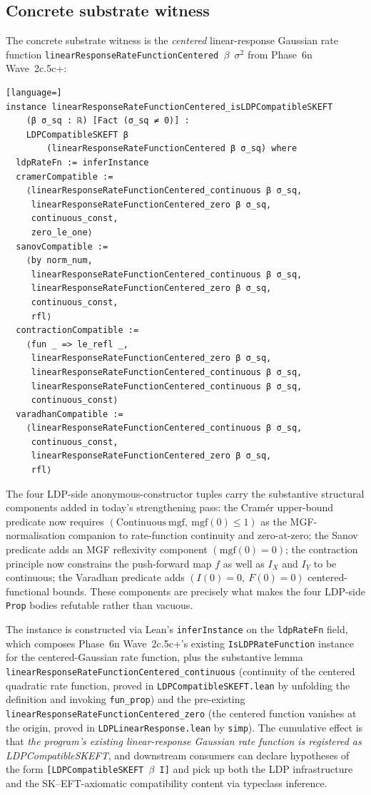 \documentclass[11pt]{article}
\begin{document}
\subsection{Concrete substrate witness}

The concrete substrate witness is the \emph{centered} linear-response
Gaussian rate function
\texttt{linearResponseRateFunctionCentered $\beta$ $\sigma^2$}
from Phase~6n Wave~2c.5c+:

\begin{lstlisting}[language=]
instance linearResponseRateFunctionCentered_isLDPCompatibleSKEFT
    (β σ_sq : ℝ) [Fact (σ_sq ≠ 0)] :
    LDPCompatibleSKEFT β
        (linearResponseRateFunctionCentered β σ_sq) where
  ldpRateFn := inferInstance
  cramerCompatible :=
    ⟨linearResponseRateFunctionCentered_continuous β σ_sq,
     linearResponseRateFunctionCentered_zero β σ_sq,
     continuous_const,
     zero_le_one⟩
  sanovCompatible :=
    ⟨by norm_num,
     linearResponseRateFunctionCentered_continuous β σ_sq,
     linearResponseRateFunctionCentered_zero β σ_sq,
     continuous_const,
     rfl⟩
  contractionCompatible :=
    ⟨fun _ => le_refl _,
     linearResponseRateFunctionCentered_zero β σ_sq,
     linearResponseRateFunctionCentered_continuous β σ_sq,
     linearResponseRateFunctionCentered_continuous β σ_sq,
     continuous_const⟩
  varadhanCompatible :=
    ⟨linearResponseRateFunctionCentered_continuous β σ_sq,
     continuous_const,
     linearResponseRateFunctionCentered_zero β σ_sq,
     rfl⟩
\end{lstlisting}

The four LDP-side anonymous-constructor tuples carry the substantive
structural components added in today's strengthening pass: the
Cram\'er upper-bound predicate now requires $(\mathrm{Continuous}\ \mathrm{mgf},\ \mathrm{mgf}(0) \leq 1)$
as the MGF-normalisation companion to rate-function continuity and
zero-at-zero; the Sanov predicate adds an MGF reflexivity component
$(\mathrm{mgf}(0) = 0)$; the contraction principle now constrains
the push-forward map $f$ as well as $I_X$ and $I_Y$ to be continuous;
the Varadhan predicate adds $(I(0) = 0,\ F(0) = 0)$ centered-functional
bounds. These components are precisely what makes the four LDP-side
\texttt{Prop} bodies refutable rather than vacuous.

The instance is constructed via Lean's \texttt{inferInstance} on the
\texttt{ldpRateFn} field, which composes Phase~6n Wave~2c.5c+'s
existing \texttt{IsLDPRateFunction} instance for the centered-Gaussian
rate function, plus the substantive lemma
\texttt{linearResponseRateFunctionCentered\_continuous}
(continuity of the centered quadratic rate function, proved in
\texttt{LDPCompatibleSKEFT.lean} by unfolding the definition and
invoking \texttt{fun\_prop}) and the pre-existing
\texttt{linearResponseRateFunctionCentered\_zero}
(the centered function vanishes at the origin, proved in
\texttt{LDPLinearResponse.lean} by \texttt{simp}). The cumulative
effect is that \emph{the program's existing linear-response
Gaussian rate function is registered as LDPCompatibleSKEFT}, and
downstream consumers can declare hypotheses of the form
\texttt{[LDPCompatibleSKEFT $\beta$ I]} and pick up both the LDP
infrastructure and the SK--EFT-axiomatic compatibility content via
typeclass inference.
\end{document}
